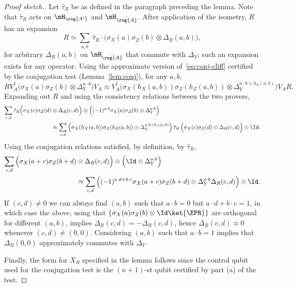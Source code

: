 \begin{proof}[Proof sketch.]
Let $\hat{\tau}_R$ be as defined in the paragraph preceding the lemma. Note that $\hat{\tau}_R$ acts on $\mH_\reg{A'}$ and $\mH_{\hat{\reg{A}}}$. After application of the isometry, $R$ has an expansion
\begin{equation}\label{eq:r-1}
R \simeq \sum_{a,b} \,\hat{\tau}_R \cdot\big(\sigma_X(a)\sigma_Z(b) \otimes \Delta_R(a,b)\big),
\end{equation}
 for arbitrary $\Delta_R(a,b)$ on $\mH_{\hat{\reg{A}}}$ that commute with $\Delta_Y$; such an expansion exists for any operator. 
Using the approximate version of~\eqref{eq:conj-cliff} certified by the conjugation test (Lemma~\ref{lem:conj}), for any $a,b$, 
$$ R V_A^\dagger \big(\sigma_X(a)\sigma_Z(b)\otimes \Delta_Y^{a\cdot b}\big) V_A \approx V_A^\dagger \big(\sigma_X(h_X(a,b))\sigma_Z(h_Z(a,b)) \otimes \Delta_Y^{a\cdot b + h_S(a,b)}\big)V_A R.$$
Expanding out $R$ and using the consistency relations between the two provers, 
\begin{align*}
\sum_{c,d} \hat{\tau}_R \Big(\sigma_X(c)\sigma_Z(d) &\otimes \Delta_R(c,d)\Big) \otimes \Big((-1)^{a\cdot b}\sigma_X(a)\sigma_Z(b)\otimes \Delta_Y^{a\cdot b}\Big)\\
& \approx \sum_{c,d} \Big(\sigma_X(h_X(a,b))\sigma_Z(h_Z(a,b)) \otimes \Delta_Y^{a\cdot b + h_S(a,b)}\Big) \,\hat{\tau}_R \, \Big(\sigma_X(c)\sigma_Z(d) \otimes \Delta_R(c,d)\Big) \otimes \Id.
\end{align*}
Using the conjugation relations satisfied, by definition, by $\hat{\tau}_R$,
\begin{align*}
\sum_{c,d} \Big(\sigma_X(a+c)\sigma_Z(b+d) &\otimes \Delta_R(c,d)\Big) \otimes \Big(\Id \otimes \Delta_Y^{a\cdot b}\Big)\\
& \approx \sum_{c,d} \Big((-1)^{a\cdot d  +b\cdot c} \sigma_X(a+c)\sigma_Z(b+d) \otimes \Delta_Y^{a\cdot b } \Delta_R(c,d)\Big) \otimes \Id .
\end{align*}
If $(c,d)\neq 0$ we can always find $(a,b)$ such that $a\cdot b = 0$ but $a\cdot d + b\cdot c = 1$, in which case the above, using that $\{\sigma_X(a)\sigma_Z(b) \otimes \Id \ket{\EPR}\}$ are orthogonal for different $(a,b)$, implies $\Delta_R(c,d)=-\Delta_R(c,d)$, hence $\Delta_R(c,d)\approx 0$ whenever $(c,d)\neq (0,0)$. 
Considering $(a,b)$ such that $a\cdot b=1$ implies that $\Delta_R(0,0)$ approximately commutes with $\Delta_Y$.

Finally,  the form for $X_R$ specified in the lemma follows since the control qubit used for the conjugation test is the $(n+1)$-st qubit certified by part (a) of the test.
\end{proof}

